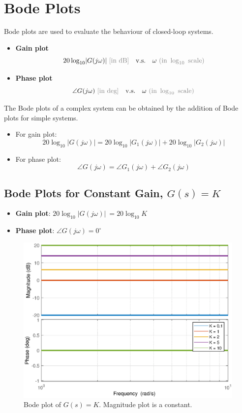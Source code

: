 \newpage
\section{Bode Plots}
Bode plots are used to evaluate the behaviour of closed-loop systems.
\begin{itemize}
    \item \textbf{Gain plot} 
    \[
        20\log_{10}\lvert G(j\omega) \rvert \ \text{\textcolor{gray}{[in dB]}}\quad \text{v.s.} \quad \omega \ \textcolor{gray}{(\text{in } \log_{10} \ \text{scale})}
    \]
    
    \item \textbf{Phase plot} 
    \[
        \angle G(j\omega) \ \text{\textcolor{gray}{[in deg]}} \quad \text{v.s.} \quad \omega \ \textcolor{gray}{(\text{in } \log_{10} \ \text{scale})}  
    \]
\end{itemize}
The Bode plots of a complex system can be obtained by the addition of Bode plots for simple systems.
\begin{itemize}
    \item For gain plot:
    \[
        20\log_{10}\lvert G(j\omega)\rvert  = 20\log_{10}\lvert G_{1}(j\omega)\rvert+20\log_{10}\lvert G_{2}(j\omega)\rvert
    \]
    
    \item For phase plot:
    \[
        \angle G(j\omega) = \angle G_{1}(j\omega)+\angle G_{2}(j\omega)
    \]
\end{itemize}

\subsection{Bode Plots for Constant Gain, $G(s) = K$}
\begin{itemize}
    \item \textbf{Gain plot}: $20\log_{10}\lvert G(j\omega) \rvert \ = 20\log_{10}K$ 
    \item \textbf{Phase plot}: $\angle G(j\omega) = 0^{\circ}$
\end{itemize}

\begin{figure}[H] 
    \centering 
    \includegraphics[width=.7\textwidth]{images/bode5.eps}
    \caption{Bode plot of $G(s) = K$. Magnitude plot is a constant.}
\end{figure}

